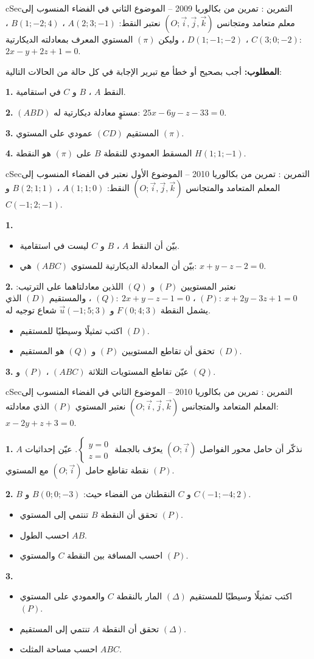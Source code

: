 \documentclass[12pt,a4paper]{article}
\newenvironment{BOX}[2]{\begin{otherlanguage}{english}\begin{arbox}{#1}{#2}}{\end{arbox}\end{otherlanguage}}
\newcounter{exo}
\newenvironment{tamrin}[1]{\stepcounter{exo}\begin{BOX}{cSec}{التمرين \theexo: #1}}{\end{BOX}}
\newenvironment{sq}{\begin{itemize}[leftmargin=2.4em,itemsep=3pt]}{\end{itemize}}
\newcommand{\qa}{\item[(أ)]}\newcommand{\qb}{\item[(ب)]}\newcommand{\qc}{\item[(جـ)]}\newcommand{\qd}{\item[(د)]}\newcommand{\qe}{\item[(هـ)]}
\newcommand{\QQ}[1]{\par\smallskip\textbf{#1.} }
\newcommand{\Rep}{(O;\vec i,\vec j,\vec k)}
\newcommand{\Sys}[1]{\left\{\begin{array}{l}#1\end{array}\right.}
\begin{document}
\begin{tamrin}{تمرين من بكالوريا 2009 -- الموضوع الثاني}
في الفضاء المنسوب إلى معلم متعامد ومتجانس $\Rep$ نعتبر النقط: $A(2;3;-1)$ ، $B(1;-2;4)$ ، $C(3;0;-2)$ ، $D(1;-1;-2)$ ، وليكن $(\pi)$ المستوي المعرف بمعادلته الديكارتية: $2x-y+2z+1=0$.
\par\textbf{المطلوب:} أجب بصحيح أو خطأ مع تبرير الإجابة في كل حالة من الحالات التالية:
\QQ{1} النقط $A$ ، $B$ و $C$ في استقامية.
\QQ{2} $(ABD)$ مستوٍ معادلة ديكارتية له: $25x-6y-z-33=0$.
\QQ{3} المستقيم $(CD)$ عمودي على المستوي $(\pi)$.
\QQ{4} المسقط العمودي للنقطة $B$ على $(\pi)$ هو النقطة $H(1;1;-1)$.
\end{tamrin}
\begin{tamrin}{تمرين من بكالوريا 2010 -- الموضوع الأول}
نعتبر في الفضاء المنسوب إلى المعلم المتعامد والمتجانس $\Rep$ النقط: $A(1;1;0)$ ، $B(2;1;1)$ و $C(-1;2;-1)$.
\QQ{1}
\begin{sq}
\qa بيّن أن النقط $A$ ، $B$ و $C$ ليست في استقامية.
\qb بيّن أن المعادلة الديكارتية للمستوي $(ABC)$ هي: $x+y-z-2=0$.
\end{sq}
\QQ{2} نعتبر المستويين $(P)$ و $(Q)$ اللذين معادلتاهما على الترتيب: $(P):\ x+2y-3z+1=0$ ، $(Q):\ 2x+y-z-1=0$ ، والمستقيم $(D)$ الذي يشمل النقطة $F(0;4;3)$ و $\vec u(-1;5;3)$ شعاع توجيه له.
\begin{sq}
\qa اكتب تمثيلًا وسيطيًا للمستقيم $(D)$.
\qb تحقق أن تقاطع المستويين $(P)$ و $(Q)$ هو المستقيم $(D)$.
\end{sq}
\QQ{3} عيّن تقاطع المستويات الثلاثة $(ABC)$ ، $(P)$ و $(Q)$.
\end{tamrin}
\begin{tamrin}{تمرين من بكالوريا 2010 -- الموضوع الثاني}
في الفضاء المنسوب إلى المعلم المتعامد والمتجانس $\Rep$ نعتبر المستوي $(P)$ الذي معادلته: $x-2y+z+3=0$.
\QQ{1} نذكّر أن حامل محور الفواصل $(O;\vec i)$ يعرّف بالجملة $\Sys{y=0\\z=0}$. عيّن إحداثيات $A$ نقطة تقاطع حامل $(O;\vec i)$ مع المستوي $(P)$.
\QQ{2} $B$ و $C$ النقطتان من الفضاء حيث: $B(0;0;-3)$ و $C(-1;-4;2)$.
\begin{sq}
\qa تحقق أن النقطة $B$ تنتمي إلى المستوي $(P)$.
\qb احسب الطول $AB$.
\qc احسب المسافة بين النقطة $C$ والمستوي $(P)$.
\end{sq}
\QQ{3}
\begin{sq}
\qa اكتب تمثيلًا وسيطيًا للمستقيم $(\Delta)$ المار بالنقطة $C$ والعمودي على المستوي $(P)$.
\qb تحقق أن النقطة $A$ تنتمي إلى المستقيم $(\Delta)$.
\qc احسب مساحة المثلث $ABC$.
\end{sq}
\end{tamrin}
\end{document}
